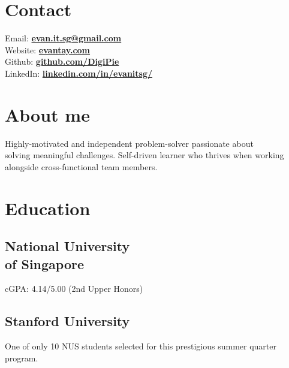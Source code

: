 \documentclass[a4paper]{deedy-resume-openfont} %
\begin{document}
%
%
\lastupdated

%
%
%
%

\begin{minipage}[t]{0.34\textwidth} 


\section{Contact} 
Email: \href{mailto:evan.it.sg@gmail.com}{\bf evan.it.sg@gmail.com} \\
Website: \href{https://www.evantay.com/}{\bf evantay.com} \\
Github: \href{https://github.com/DigiPie}{\bf github.com/DigiPie} \\
LinkedIn:  \href{https://www.linkedin.com/in/evanitsg/}{\bf linkedin.com/in/evanitsg/}
\sectionsep



\section{About me} 
Highly-motivated and independent problem-solver passionate about\\ solving meaningful challenges. Self-driven learner who thrives when working alongside cross-functional team members.
\sectionsep

\section{Education} 
\subsection{National University \\ of Singapore}
cGPA: 4.14/5.00 (2nd Upper Honors)
\sectionsep
\subsection{Stanford University}
One of only 10 NUS students selected for this prestigious summer quarter program.
\sectionsep

\end{minipage}
\end{document}
